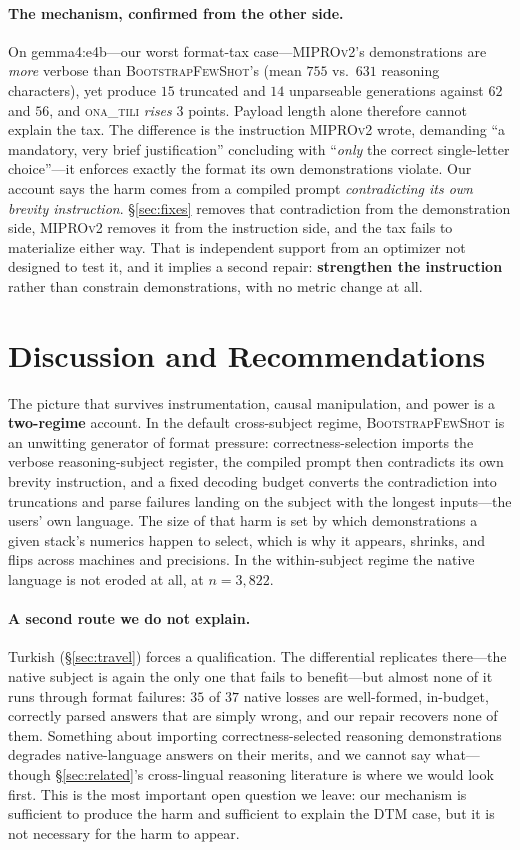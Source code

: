 \documentclass[11pt]{article}
\newcommand{\ona}{\textsc{ona\_tili}}
\newcommand{\bsfs}{\textsc{BootstrapFewShot}}
\begin{document}
\paragraph{The mechanism, confirmed from the other side.} On gemma4:e4b---our worst
format-tax case---\textsc{MIPROv2}'s demonstrations are \emph{more} verbose than
\bsfs{}'s (mean $755$ vs.\ $631$ reasoning characters), yet produce $15$ truncated and
$14$ unparseable generations against $62$ and $56$, and \ona{} \emph{rises} $3$ points.
Payload length alone therefore cannot explain the tax. The difference is the instruction
\textsc{MIPROv2} wrote, demanding ``a mandatory, very brief justification'' concluding
with ``\emph{only} the correct single-letter choice''---it enforces exactly the format
its own demonstrations violate. Our account says the harm comes from a compiled prompt
\emph{contradicting its own brevity instruction}. \S\ref{sec:fixes} removes that
contradiction from the demonstration side, \textsc{MIPROv2} removes it from the
instruction side, and the tax fails to materialize either way. That is independent
support from an optimizer not designed to test it, and it implies a second repair:
\textbf{strengthen the instruction} rather than constrain demonstrations, with no metric
change at all.

\section{Discussion and Recommendations}
The picture that survives instrumentation, causal manipulation, and power is a
\textbf{two-regime} account. In the default cross-subject regime, \bsfs{} is an
unwitting generator of format pressure: correctness-selection imports the verbose
reasoning-subject register, the compiled prompt then contradicts its own brevity
instruction, and a fixed decoding budget converts the contradiction into truncations
and parse failures landing on the subject with the longest inputs---the users' own
language. The size of
that harm is set by which demonstrations a given stack's numerics happen to select,
which is why it appears, shrinks, and flips across machines and precisions. In the
within-subject regime the native language is not eroded at all, at
$n{=}3{,}822$.

\paragraph{A second route we do not explain.} Turkish (\S\ref{sec:travel}) forces a
qualification. The differential replicates there---the native subject is again the only
one that fails to benefit---but almost none of it runs through format failures: $35$ of
$37$ native losses are well-formed, in-budget, correctly parsed answers that are simply
wrong, and our repair recovers none of them. Something about importing
correctness-selected reasoning demonstrations degrades native-language answers on their
merits, and we cannot say what---though \S\ref{sec:related}'s cross-lingual reasoning
literature is where we would look first. This is the most important open question we
leave: our
mechanism is sufficient to produce the harm and sufficient to explain the DTM case, but
it is not necessary for the harm to appear.
\end{document}
